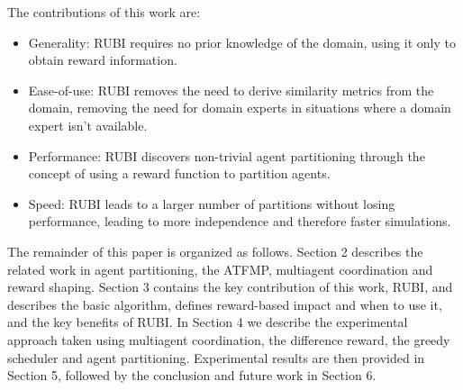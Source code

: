 \documentclass[letterpaper]{article}
\begin{document}
 
The contributions of this work are:
\begin{itemize} 
\item Generality: RUBI requires no prior knowledge of the domain, using it only to obtain reward information.
\item Ease-of-use: RUBI removes the need to derive similarity metrics from the domain, removing the need for domain experts in situations where a domain expert isn't available.
\item Performance: RUBI discovers non-trivial agent partitioning through the concept of using a reward function to partition agents.
\item Speed: RUBI leads to a larger number of partitions without losing performance, leading to more independence and therefore faster simulations.
\end{itemize} 
 
The remainder of this paper is organized as follows. Section 2 describes the related work in agent partitioning, the ATFMP, multiagent coordination and reward shaping. Section 3 contains the key contribution of this work, RUBI, and describes the basic algorithm, defines reward-based impact and when to use it, and the key benefits of RUBI. In Section 4 we describe the experimental approach taken using multiagent coordination, the difference reward, the greedy scheduler and agent partitioning. Experimental results are then provided in Section 5, followed by the conclusion and future work in Section 6.
\end{document}
